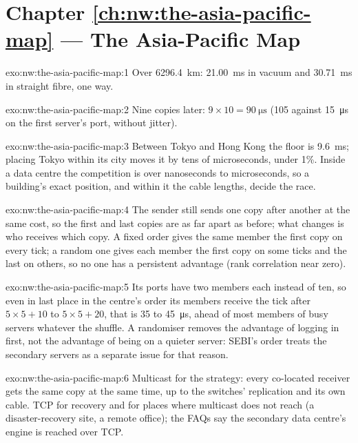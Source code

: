 \section*{Chapter \ref{ch:nw:the-asia-pacific-map} --- The Asia-Pacific Map}

\begin{solution}{exo:nw:the-asia-pacific-map:1}
Over \qty{6296.4}{\kilo\metre}: \qty{21.00}{\milli\second} in vacuum and \qty{30.71}{\milli\second} in straight fibre, one way.
\end{solution}

\begin{solution}{exo:nw:the-asia-pacific-map:2}
Nine copies later: $9 \times 10 = \qty{90}{\micro\second}$ (105 against \qty{15}{\micro\second} on the first server's port, without jitter).
\end{solution}

\begin{solution}{exo:nw:the-asia-pacific-map:3}
Between Tokyo and Hong Kong the floor is \qty{9.6}{\milli\second}; placing Tokyo within its city moves it by tens of microseconds, under 1\%.
Inside a data centre the competition is over nanoseconds to microseconds, so a building's exact position, and within it the cable
lengths, decide the race.
\end{solution}

\begin{solution}{exo:nw:the-asia-pacific-map:4}
The sender still sends one copy after another at the same cost, so the first and last copies are as far apart as before; what changes is who
receives which copy. A fixed order gives the same member the first copy on every tick; a random one gives each member the first copy on some
ticks and the last on others, so no one has a persistent advantage (rank correlation near zero).
\end{solution}

\begin{solution}{exo:nw:the-asia-pacific-map:5}
Its ports have two members each instead of ten, so even in last place in the centre's order its members receive the tick after
$5 \times 5 + 10$ to $5 \times 5 + 20$, that is 35 to \qty{45}{\micro\second}, ahead of most members of busy servers whatever the shuffle. A
randomiser removes the advantage of logging in first, not the advantage of being on a quieter server: SEBI's order treats the secondary
servers as a separate issue for that reason.
\end{solution}

\begin{solution}{exo:nw:the-asia-pacific-map:6}
Multicast for the strategy: every co-located receiver gets the same copy at the same time, up to the switches' replication and its own cable.
TCP for recovery and for places where multicast does not reach (a disaster-recovery site, a remote office); the FAQs say the secondary data
centre's engine is reached over TCP.
\end{solution}

